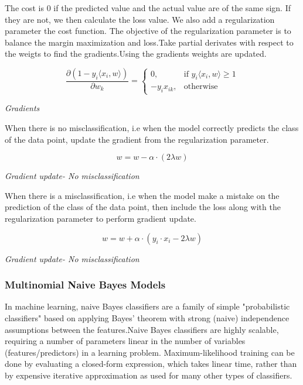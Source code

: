 \documentclass[12pt,a4paper,final]{extreport}
\begin{document}
The cost is 0 if the predicted value and the actual value are of the same sign. If they are not, we then calculate the loss value. We also add a regularization parameter the cost function. The objective of the regularization parameter is to balance the margin maximization and loss.Take partial derivates with respect to the weigts to find the gradients.Using the gradients weights are updated.
 
 \begin{mycapequ}[!ht]
\[
 \frac{\partial (1-y_{i}\langle x_{i},w\rangle) }{\partial w_{k}} =
 \begin{cases}
 0,& \text{if } y_{i}\langle x_{i},w\rangle\geq 1\\
 -y_{i}x_{ik},              & \text{otherwise}
 \end{cases}
\]
\caption{\textit{Gradients}}
\end{mycapequ}
 
When there is no misclassification, i.e when the model correctly predicts the class of the data point, update the gradient from the regularization parameter.
 
\begin{mycapequ}[!ht]
\[
w = w - \alpha\cdot(2\lambda w)
\]
\caption{\textit{Gradient update- No misclassification}}
\end{mycapequ}

When there is a misclassification, i.e when the model make a mistake on the prediction of the class of the data point, then include the loss along with the regularization parameter to perform gradient update.
 
\begin{mycapequ}[!ht]
\[
w = w + \alpha\cdot(y_{i}\cdot x_{i} - 2\lambda w)
\]
\caption{\textit{Gradient update- No misclassification}}
\end{mycapequ}

 \subsubsection{Multinomial Naive Bayes Models}
In machine learning, naive Bayes classifiers are a family of simple "probabilistic classifiers" based on applying Bayes' theorem with strong (naive) independence assumptions between the features.Naive Bayes classifiers are highly scalable, requiring a number of parameters linear in the number of variables (features/predictors) in a learning problem. Maximum-likelihood training can be done by evaluating a closed-form expression, which takes linear time, rather than by expensive iterative approximation as used for many other types of classifiers.
\end{document}
